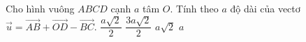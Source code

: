 \begin{ex}%
	Cho hình vuông $ABCD$ cạnh $a$ tâm $O$. Tính theo $a$ độ dài của vectơ $\overrightarrow{u}=\overrightarrow{AB}+\overrightarrow{OD} -\overrightarrow{BC}$.
		\choice
		{\True $\dfrac{a\sqrt{2}}{2}$}
		{$\dfrac{3a\sqrt{2}}{2}$}
		{$a\sqrt{2}$}
		{$a$}
\end{ex}

